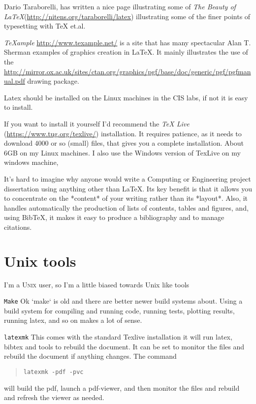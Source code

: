 \documentclass{tufte-handout}
\begin{document}
Dario Taraborelli, has written a nice page illustrating some of
 \emph{The Beauty of LaTeX}(\url{http://nitens.org/taraborelli/latex}) illustrating some
 of the finer points of typesetting with TeX et.al. 

 \emph{TeXample} \url{http://www.texample.net/} is a site that has many spectacular
Alan T. Sherman
 examples of graphics creation in LaTeX.
 It mainly illustrates the use of the
 \url{http://mirror.ox.ac.uk/sites/ctan.org/graphics/pgf/base/doc/generic/pgf/pgfmanual.pdf} 
 drawing package.

Latex should be installed on the Linux machines in the CIS labs, if not it is
easy to install.

If you want to install it yourself I'd recommend the \emph{TeX Live} (\url{https://www.tug.org/texlive/})
installation.  It requires patience, as it needs to download 4000 or so
(small) files, that gives you a complete installation.  About 6GB on my Linux
machines.  I also use the Windows version of TexLive on my windows machine, 

It's hard to imagine why anyone would write a Computing or Engineering project
dissertation using anything other than LaTeX.  Its key benefit is that it
allows you to concentrate on the *content* of your writing rather than its
*layout*.   Also, it handles automatically the production of lists of contents,
tables and figures, and, using BibTeX, it makes it easy to produce a
bibliography and to manage citations. 

\section{Unix tools}
I'm a \textsc{Unix} user, so I'm a little biased towards Unix like tools

\texttt{Make}
 Ok `make` is old and there are better newer build systems about.  
 Using a build system for compiling and running code, running tests, plotting
results, running latex, and so on makes a lot of sense.

\texttt{latexmk}
This  comes with the standard Texlive installation it will run latex, bibtex and tools to
rebuild the document.  It can be set to monitor the files and rebuild the
document if anything changes.
The command
\begin{quote}
	\texttt{latexmk -pdf -pvc}
\end{quote}
will build the pdf, launch a pdf-viewer, and then monitor the files and
rebuild and refresh the viewer as needed.
\end{document}
